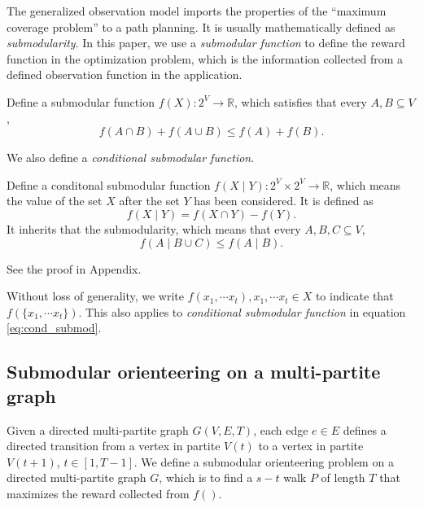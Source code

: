\documentclass[12pt]{article}
\begin{document}
The generalized observation model imports the properties of the ``maximum coverage problem'' to a path planning. It is usually mathematically defined as \emph{submodularity}. In this paper, we use a \emph{submodular function} to define the reward function in the optimization problem, which is the information collected from a defined observation function in the application.

\begin{mydef}
\label{def:submod_func}
Define a submodular function $ f( X ): 2^{V} \rightarrow \mathbb{R} $, which satisfies that every $ A, B \subseteq V $,
\begin{equation}
\label{eq:submod}
f(A \cap B) + f(A \cup B) \leq f(A) + f(B).
\end{equation}
\end{mydef}

We also define a \emph{conditional submodular function}.


\begin{mydef}
\label{def:cond_submod_func}
Define a conditonal submodular function $ f( X \mid Y ): 2^{V} \times 2^{V} \rightarrow \mathbb{R} $, which means the value of the set $ X $ after the set $ Y $ has been considered. It is defined as
\begin{equation}
\label{eq:cond_submod}
f( X \mid Y ) = f( X \cap Y ) - f( Y ).
\end{equation}
It inherits that the submodularity, which means that every $ A, B, C \subseteq V $,
\begin{equation}
\label{eq:cond_submod_prop}
f(A \mid B \cup C) \leq f(A \mid B).
\end{equation}

See the proof in Appendix.

\end{mydef}

Without loss of generality, we write $ f( x_{1} , \cdots x_{t} ), x_{1} , \cdots x_{t} \in X $ to indicate that $ f( \{ x_{1} , \cdots x_{t} \}) $.
This also applies to \emph{conditional submodular function} in equation \eqref{eq:cond_submod}.

\subsection{Submodular orienteering on a multi-partite graph}

\begin{mydef}
\label{def:submod_orienteer}
Given a directed multi-partite graph $ G(V, E, T) $, each edge $ e \in E $ defines a directed transition from a vertex in partite $ V(t) $ to a vertex in partite $ V(t+1) $, $ t \in [1, T-1] $.
We define a submodular orienteering problem on a directed multi-partite graph $ G $, which is to find a $ s-t $ walk $ P $ of length $ T $ that maximizes the reward collected from $ f() $.
\end{mydef}
\end{document}
